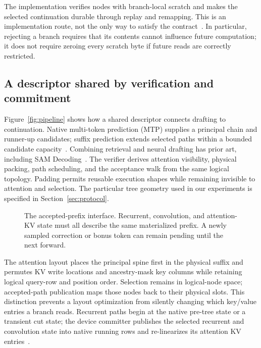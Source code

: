 \documentclass[conference]{IEEEtran}
\begin{document}
The implementation verifies nodes with branch-local scratch and makes the selected continuation durable through replay and remapping. This is an implementation route, not the only way to satisfy the contract~\cite{lumo2026archive,lumo2026stateless}. In particular, rejecting a branch requires that its contents cannot influence future computation; it does not require zeroing every scratch byte if future reads are correctly restricted.

\subsection{A descriptor shared by verification and commitment}
Figure~\ref{fig:pipeline} shows how a shared descriptor connects drafting to continuation. Native multi-token prediction (MTP) supplies a principal chain and runner-up candidates; suffix prediction extends selected paths within a bounded candidate capacity~\cite{oliaro2025suffix,arctic2026suffix}. Combining retrieval and neural drafting has prior art, including SAM Decoding~\cite{hu2024sam}. The verifier derives attention visibility, physical packing, path scheduling, and the acceptance walk from the same logical topology. Padding permits reusable execution shapes while remaining invisible to attention and selection. The particular tree geometry used in our experiments is specified in Section~\ref{sec:protocol}.

\begin{figure}[t]
\centering

\caption{The accepted-prefix interface. Recurrent, convolution, and attention-KV state must all describe the same materialized prefix. A newly sampled correction or bonus token can remain pending until the next forward.}
\label{fig:contract}
\end{figure}

The attention layout places the principal spine first in the physical suffix and permutes KV write locations and ancestry-mask key columns while retaining logical query-row and position order. Selection remains in logical-node space; accepted-path publication maps those nodes back to their physical slots. This distinction prevents a layout optimization from silently changing which key/value entries a branch reads. Recurrent paths begin at the native pre-tree state or a transient cut state; the device committer publishes the selected recurrent and convolution state into native running rows and re-linearizes its attention KV entries~\cite{lumo2026archive,lumo2026stateless}.
\end{document}
